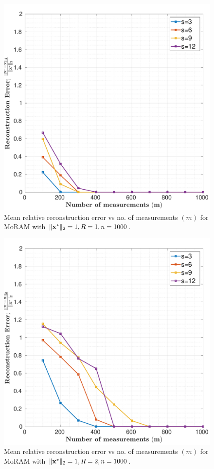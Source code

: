 \begin{figure}[h!]
	\begin{center}
		\includegraphics[width=0.9\linewidth]{./fig/rconst_rcm_amp_1_r_1_s_3_12_m_100_1000_justice-pursuit.pdf}
	\end{center}
	\caption{{Mean relative reconstruction error vs no. of measurements $(m)$ for MoRAM with $\|\mathbf{x^*}\|_2=1,R=1,n=1000$.}}
	\label{fig:plot-r-1}
\end{figure}


\begin{figure}[h]
	\begin{center}
		\includegraphics[width=0.9\linewidth]{./fig/rconst_rcm_amp_1_r_2_s_3_12_m_100_1000_justice-pursuit.pdf}
	\end{center}
	\caption{{Mean relative reconstruction error vs no. of measurements $(m)$ for MoRAM with $\|\mathbf{x^*}\|_2=1,R=2,n=1000$.}}
	\label{fig:plot-r-2}
\end{figure}


